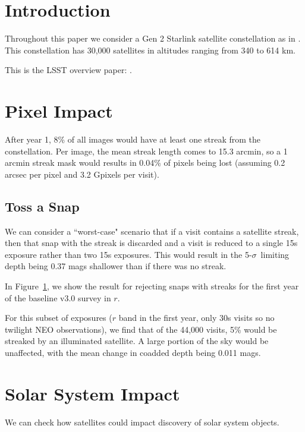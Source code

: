 \section{Introduction}



Throughout this paper we consider a Gen 2 Starlink satellite constellation as in \citet{Hu2022}. This constellation has 30,000 satellites in altitudes ranging from 340 to 614 km. 

This is the LSST overview paper: \cite{2008arXiv0805.2366I}.



\section{Pixel Impact}

After year 1, 8\% of all images would have at least one streak from the constellation. Per image, the mean streak length comes to 15.3 arcmin, so a 1 arcmin streak mask would results in 0.04\% of pixels being lost (assuming 0.2 arcsec per pixel and 3.2 Gpixels per visit).





\subsection{Toss a Snap}

We can consider a ``worst-case" scenario that if a visit contains a satellite streak, then that snap with the streak is discarded and a visit is reduced to a single 15s exposure rather than two 15s exposures. This would result in the 5-$\sigma$\ limiting depth being 0.37 mags shallower than if there was no streak.

In Figure~\ref{fig:depth_change}, we show the result for rejecting snaps with streaks for the first year of the baseline v3.0 survey in $r$. 

For this subset of exposures ($r$ band in the first year, only 30s visits so no twilight NEO observations), we find that of the 44,000 visits, 5\% would be streaked by an illuminated satellite. A large portion of the sky would be unaffected, with the mean change in coadded depth being 0.011 mags. 

\begin{figure}
\caption{ \label{fig:depth_change}}
\end{figure}



\section{Solar System Impact}


We can check how satellites could impact discovery of solar system objects. 